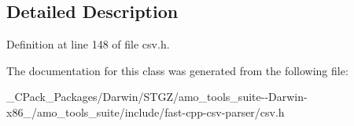 \subsection{Detailed Description}


Definition at line 148 of file csv.\+h.



The documentation for this class was generated from the following file\+:\begin{DoxyCompactItemize}
\item 
\+\_\+\+C\+Pack\+\_\+\+Packages/\+Darwin/\+S\+T\+G\+Z/amo\+\_\+tools\+\_\+suite-\/-\/\+Darwin-\/x86\+\_/amo\+\_\+tools\+\_\+suite/include/fast-\/cpp-\/csv-\/parser/csv.\+h\end{DoxyCompactItemize}
